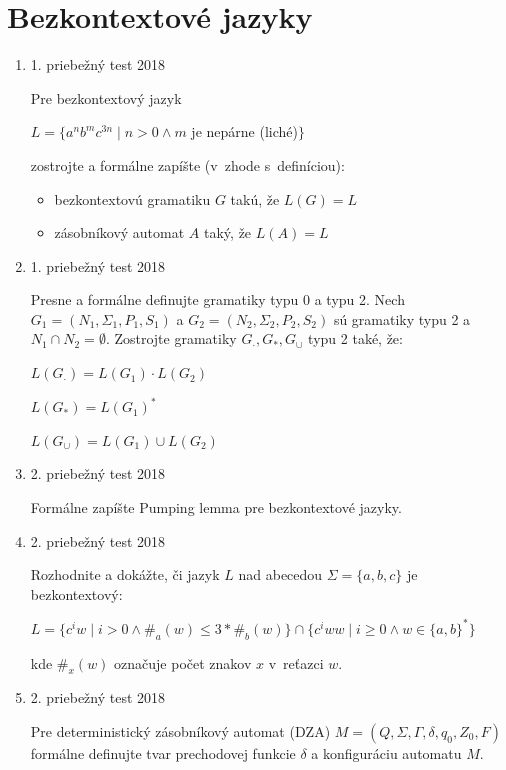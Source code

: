 \documentclass[11pt,a4paper]{article}
\begin{document}
	\section{Bezkontextové jazyky}

	\begin{enumerate}
		\item 1. priebežný test 2018

		Pre bezkontextový jazyk

		$L = \{a^nb^mc^{3n} \mid n > 0 \land m$ je nepárne (liché)$\}$

		zostrojte a formálne zapíšte (v~zhode s~definíciou):
		\begin{itemize}
			\item bezkontextovú gramatiku $G$ takú, že $L(G) = L$
			\item zásobníkový automat $A$ taký, že $L(A) = L$
		\end{itemize}

		\item 1. priebežný test 2018

		Presne a formálne definujte gramatiky typu 0 a typu 2. Nech $G_1 = (N_1, \Sigma_1, P_1, S_1)$ a $G_2 = (N_2, \Sigma_2, P_2, S_2)$ sú gramatiky typu 2 a $N_1 \cap N_2 = \emptyset$. Zostrojte gramatiky $G_{\cdot}, G_*, G_{\cup}$ typu 2 také, že:

		$L(G_{\cdot}) = L(G_1) \cdot L(G_2)$

		$L(G_{*}) = L(G_1)^*$

		$L(G_{\cup}) = L(G_1) \cup L(G_2)$

		\item 2. priebežný test 2018

		Formálne zapíšte Pumping lemma pre bezkontextové jazyky.

		\item 2. priebežný test 2018

		Rozhodnite a dokážte, či jazyk $L$ nad abecedou $\Sigma = \{a,b,c\}$ je bezkontextový:

		$L = \{c^iw \mid i > 0 \land \#_a(w) \leq 3 * \#_b(w)\} \cap \{c^iww \mid i \geq 0 \land w \in \{a,b\}^*\}$

		kde $\#_x(w)$ označuje počet znakov $x$ v~reťazci $w$.

		\item 2. priebežný test 2018

		Pre deterministický zásobníkový automat (DZA) $M = (Q, \Sigma, \Gamma, \delta, q_0, Z_0, F)$ formálne definujte tvar prechodovej funkcie $\delta$ a konfiguráciu automatu $M$.


\end{enumerate}
\end{document}
